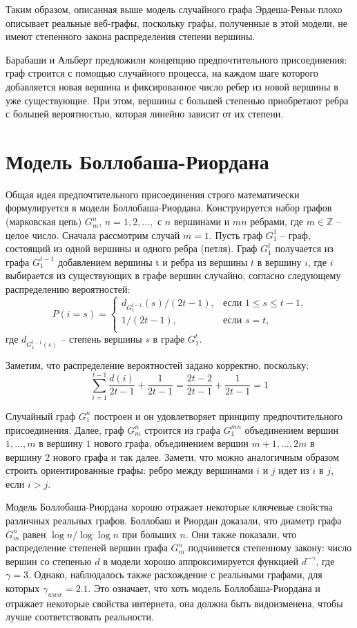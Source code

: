 \documentclass[14pt]{extreport}
\begin{document}
Таким образом, описанная выше модель случайного графа Эрдеша-Реньи плохо описывает реальные веб-графы, поскольку графы, полученные в этой модели, не имеют степенного закона распределения степени вершины. 

Барабаши и Альберт предложили концепцию предпочтительного присоединения: граф строится с помощью случайного процесса, на каждом шаге которого добавляется новая вершина и фиксированное число ребер из новой вершины в уже существующие. При этом, вершины с большей степенью приобретают ребра с большей вероятностью, которая линейно зависит от их степени.

\section{Модель Боллобаша-Риордана}
Общая идея предпочтительного присоединения строго математически формулируется в модели Боллобаша-Риордана. Конструируется набор графов (марковская цепь) $G_m^n$, $n=1, 2, \dots,$ с $n$ вершинами и $mn$ ребрами, где $m \in \mathbb{Z}$ -- целое число. Сначала рассмотрим случай $m = 1$. Пусть граф $G_1^1$ -- граф, состоящий из одной вершины и одного ребра (петля). Граф $G_1^t$ получается из графа $G_1^{t-1}$ добавлением вершины t и ребра из вершины $t$ в вершину $i$, где $i$ выбирается из существующих в графе вершин случайно, согласно следующему распределению вероятностей:
$$  
P(i=s) =
\begin{cases}  
  d_{G_1^{t-1}}(s)/(2t-1),&\text{если $1 \le s \le t-1$,}\\
  1/(2t-1),&\text{если $s=t$,}\\
\end{cases}
$$  
где $d_{G_1^{t-1}(s)}$ -- степень вершины $s$ в графе $G_1^t$. 

Заметим, что распределение вероятностей задано корректно, поскольку:
$$
\sum_{i=1}^{t-1}\frac{d(i)}{2t-1} + \frac{1}{2t-1}=\frac{2t-2}{2t-1}+\frac{1}{2t-1}=1
$$

Случайный граф $G_1^n$ построен и он удовлетворяет принципу предпочтительного присоединения. Далее, граф $G_m^n$ строится из графа $G_1^{mn}$ объединением вершин $1, \dots, m$ в вершину $1$ нового графа, объединением вершин $m+1, \dots, 2m$ в вершину 2 нового графа и так далее. Замети, что можно аналогичным образом строить ориентированные графы: ребро между вершинами $i$ и $j$ идет из $i$ в $j$, если $i > j$.

Модель Боллобаша-Риордана хорошо отражает некоторые ключевые свойства различных реальных графов. Боллобаш и Риордан доказали, что диаметр графа $G_m^n$ равен $\log n / \log \log n$ при больших $n$. Они также показали, что распределение степеней вершин графа $G_m^n$ подчиняется степенному закону: число вершин со степенью $d$ в модели хорошо аппроксимируется функцией $d^{-\gamma}$, где $\gamma  = 3$. Однако, наблюдалось также расхождение с реальными графами, для которых $\gamma_{www}=2.1$. Это означает, что хоть модель Боллобаша-Риордана и отражает некоторые свойства интернета, она должна быть видоизменена, чтобы лучше соответствовать реальности.
\end{document}
